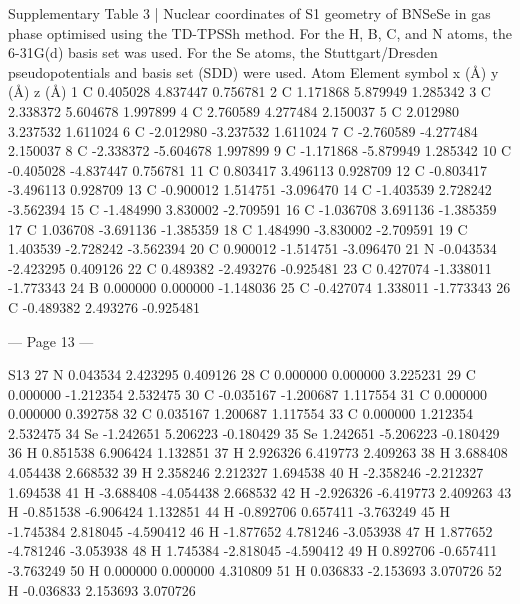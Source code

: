  
Supplementary Table 3 | Nuclear coordinates of S1 geometry of BNSeSe in gas phase 
optimised using the TD-TPSSh method. For the H, B, C, and N atoms, the 6-31G(d) basis set 
was used. For the Se atoms, the Stuttgart/Dresden pseudopotentials and basis set (SDD) were 
used. 
Atom 
Element symbol 
x (Å)        
y (Å)       
z (Å)        
1 
C 
0.405028  
4.837447  
0.756781  
2 
C 
1.171868  
5.879949  
1.285342  
3 
C 
2.338372  
5.604678  
1.997899  
4 
C 
2.760589  
4.277484  
2.150037  
5 
C 
2.012980  
3.237532  
1.611024  
6 
C 
-2.012980  
-3.237532  
1.611024  
7 
C 
-2.760589  
-4.277484  
2.150037  
8 
C 
-2.338372  
-5.604678  
1.997899  
9 
C 
-1.171868  
-5.879949  
1.285342  
10 
C 
-0.405028  
-4.837447  
0.756781  
11 
C 
0.803417  
3.496113  
0.928709  
12 
C 
-0.803417  
-3.496113  
0.928709  
13 
C 
-0.900012  
1.514751  
-3.096470  
14 
C 
-1.403539  
2.728242  
-3.562394  
15 
C 
-1.484990  
3.830002  
-2.709591  
16 
C 
-1.036708  
3.691136  
-1.385359  
17 
C 
1.036708  
-3.691136  
-1.385359  
18 
C 
1.484990  
-3.830002  
-2.709591  
19 
C 
1.403539  
-2.728242  
-3.562394  
20 
C 
0.900012  
-1.514751  
-3.096470  
21 
N 
-0.043534  
-2.423295  
0.409126  
22 
C 
0.489382  
-2.493276  
-0.925481  
23 
C 
0.427074  
-1.338011  
-1.773343  
24 
B 
0.000000  
0.000000  
-1.148036  
25 
C 
-0.427074  
1.338011  
-1.773343  
26 
C 
-0.489382  
2.493276  
-0.925481  


--- Page 13 ---
 
S13 
27 
N 
0.043534  
2.423295  
0.409126  
28 
C 
0.000000  
0.000000  
3.225231  
29 
C 
0.000000  
-1.212354  
2.532475  
30 
C 
-0.035167  
-1.200687  
1.117554  
31 
C 
0.000000  
0.000000  
0.392758  
32 
C 
0.035167  
1.200687  
1.117554  
33 
C 
0.000000  
1.212354  
2.532475  
34 
Se 
-1.242651  
5.206223  
-0.180429  
35 
Se 
1.242651  
-5.206223  
-0.180429  
36 
H 
0.851538  
6.906424  
1.132851  
37 
H 
2.926326  
6.419773  
2.409263  
38 
H 
3.688408  
4.054438  
2.668532  
39 
H 
2.358246  
2.212327  
1.694538  
40 
H 
-2.358246  
-2.212327  
1.694538  
41 
H 
-3.688408  
-4.054438  
2.668532  
42 
H 
-2.926326  
-6.419773  
2.409263  
43 
H 
-0.851538  
-6.906424  
1.132851  
44 
H 
-0.892706  
0.657411  
-3.763249  
45 
H 
-1.745384  
2.818045  
-4.590412  
46 
H 
-1.877652  
4.781246  
-3.053938  
47 
H 
1.877652  
-4.781246  
-3.053938  
48 
H 
1.745384  
-2.818045  
-4.590412  
49 
H 
0.892706  
-0.657411  
-3.763249  
50 
H 
0.000000  
0.000000  
4.310809  
51 
H 
0.036833  
-2.153693  
3.070726  
52 
H 
-0.036833  
2.153693  
3.070726  
 
